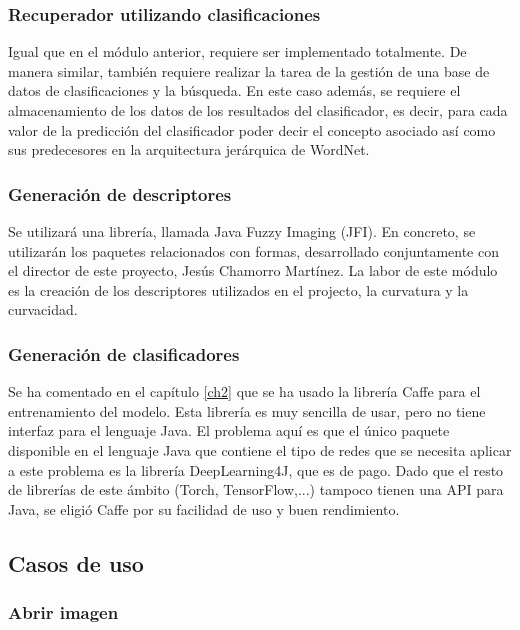 \subsubsection{Recuperador utilizando clasificaciones}

Igual que en el módulo anterior, requiere ser implementado totalmente. De manera similar, también requiere realizar la tarea de la gestión de una base de datos de clasificaciones y la búsqueda. En este caso además, se requiere el almacenamiento de los datos de los resultados del clasificador, es decir, para cada valor de la predicción del clasificador poder decir el concepto asociado así como sus predecesores en la arquitectura jerárquica de WordNet.\\

\subsubsection{Generación de descriptores}

Se utilizará una librería, llamada Java Fuzzy Imaging (JFI). En concreto, se utilizarán los paquetes relacionados con formas, desarrollado conjuntamente con el director de este proyecto, Jesús Chamorro Martínez. La labor de este módulo es la creación de los descriptores utilizados en el projecto, la curvatura y la curvacidad.\\
  
\subsubsection{Generación de clasificadores}

Se ha comentado en el capítulo \ref{ch2} que se ha usado la librería Caffe para el entrenamiento del modelo. Esta librería es muy sencilla de usar, pero no tiene interfaz para el lenguaje Java. El problema aquí es que el único paquete disponible en el lenguaje Java que contiene el tipo de redes que se necesita aplicar a este problema es la librería DeepLearning4J, que es de pago. Dado que el resto de librerías de este ámbito (Torch, TensorFlow,...) tampoco tienen una API para Java, se eligió Caffe por su facilidad de uso y buen rendimiento.\\

\subsection{Casos de uso}

\subsubsection{Abrir imagen}

